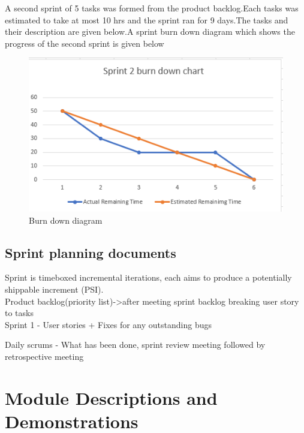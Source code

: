 \documentclass[11 pt]{article}
\begin{document}
A second sprint of 5 tasks was formed from the product backlog.Each tasks was estimated to take at most 10 hrs and the sprint ran for 9 days.The tasks and their description are given below.A sprint burn down diagram which shows the progress of the second sprint is given below
\begin{figure}[h]
\centering
\includegraphics[width=\linewidth]{sprint3.PNG}
\caption{Burn down diagram}
\label{fig:ERD}
\end{figure}
\subsection{Sprint planning documents}

Sprint is timeboxed incremental iterations, each aims to produce a potentially shippable increment (PSI).\\
Product backlog(priority list)->after meeting sprint backlog breaking user story to tasks \\
Sprint 1 - User stories + Fixes for any outstanding bugs

Daily scrums - What has been done, sprint review meeting
followed by retrospective meeting
\clearpage
\section{Module Descriptions and Demonstrations}
\end{document}
